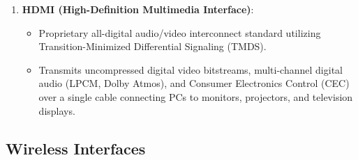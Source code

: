 \begin{enumerate}[leftmargin=1.5em]
    \item \textbf{HDMI (High-Definition Multimedia Interface)}:
    \begin{itemize}
        \item Proprietary all-digital audio/video interconnect standard utilizing Transition-Minimized Differential Signaling (TMDS).
        \item Transmits uncompressed digital video bitstreams, multi-channel digital audio (LPCM, Dolby Atmos), and Consumer Electronics Control (CEC) over a single cable connecting PCs to monitors, projectors, and television displays.
    \end{itemize}
\end{enumerate}

\subsection{Wireless Interfaces}

